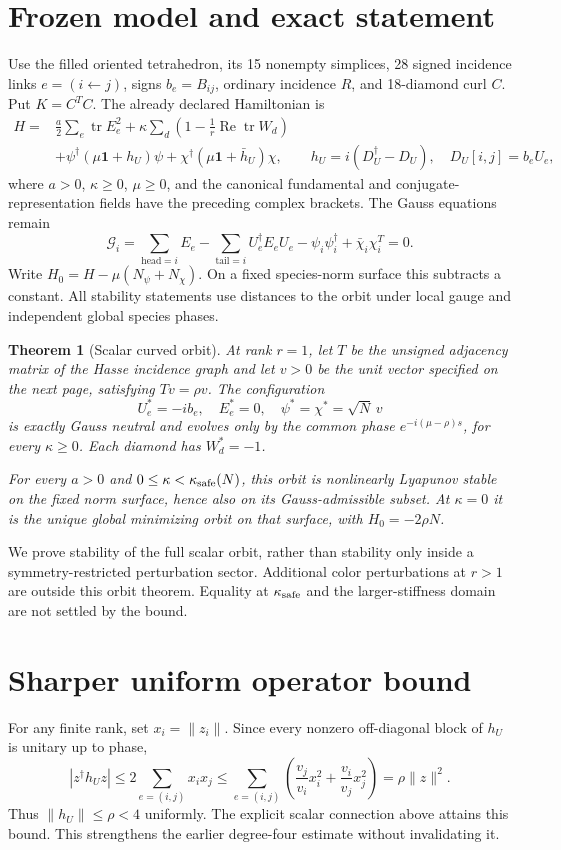 \documentclass[11pt,a4paper]{article}
\newtheorem{theorem}{Theorem}\newtheorem{lemma}[theorem]{Lemma}\newtheorem{proposition}[theorem]{Proposition}
\newcommand{\id}{\mathbf1}\newcommand{\tr}{\operatorname{tr}}\newcommand{\diag}{\operatorname{diag}}\newcommand{\Rea}{\operatorname{Re}}
\begin{document}
\newpage
\section{Frozen model and exact statement}
Use the filled oriented tetrahedron, its 15 nonempty simplices, 28 signed incidence links $e=(i\leftarrow j)$, signs $b_e=B_{ij}$, ordinary incidence $R$, and 18-diamond curl $C$. Put $K=C^TC$. The already declared Hamiltonian is
\begin{align*}
H={}&\frac a2\sum_e\tr E_e^2+\kappa\sum_d\left(1-\frac1r\Rea\tr W_d\right)\\
&+\psi^\dagger(\mu\id+h_U)\psi+\chi^\dagger(\mu\id+\bar h_U)\chi,
\qquad h_U=i(D_U^\dagger-D_U),\quad D_U[i,j]=b_eU_e,
\end{align*}
where $a>0$, $\kappa\geq0$, $\mu\geq0$, and the canonical fundamental and conjugate-representation fields have the preceding complex brackets. The Gauss equations remain
\[
\mathcal G_i=\sum_{\mathrm{head}=i}E_e-
\sum_{\mathrm{tail}=i}U_e^\dagger E_eU_e
-\psi_i\psi_i^\dagger+\bar\chi_i\chi_i^T=0.
\]
Write $H_0=H-\mu(N_\psi+N_\chi)$. On a fixed species-norm surface this subtracts a constant. All stability statements use distances to the orbit under local gauge and independent global species phases.

\begin{theorem}[Scalar curved orbit]\label{th:scalar}
At rank $r=1$, let $T$ be the unsigned adjacency matrix of the Hasse incidence graph and let $v>0$ be the unit vector specified on the next page, satisfying $Tv=\rho v$. The configuration
\[
U_e^*=-ib_e,\quad E_e^*=0,\quad
\psi^*=\chi^*=\sqrt N\,v
\]
is exactly Gauss neutral and evolves only by the common phase
$e^{-i(\mu-\rho)s}$, for every $\kappa\geq0$. Each diamond has $W_d^*=-1$.

For every $a>0$ and $0\leq\kappa<\kappa_{\rm safe}(N)$, this orbit is nonlinearly Lyapunov stable on the fixed norm surface, hence also on its Gauss-admissible subset. At $\kappa=0$ it is the unique global minimizing orbit on that surface, with $H_0=-2\rho N$.
\end{theorem}
We prove stability of the full scalar orbit, rather than stability only inside a symmetry-restricted perturbation sector. Additional color perturbations at $r>1$ are outside this orbit theorem. Equality at $\kappa_{\rm safe}$ and the larger-stiffness domain are not settled by the bound.

\section{Sharper uniform operator bound}
For any finite rank, set $x_i=\|z_i\|$. Since every nonzero off-diagonal block of $h_U$ is unitary up to phase,
\[
|z^\dagger h_Uz|\leq2\sum_{e=(i,j)}x_ix_j
\leq\sum_{e=(i,j)}\left(\frac{v_j}{v_i}x_i^2+\frac{v_i}{v_j}x_j^2\right)
=\rho\|z\|^2.
\]
Thus $\|h_U\|\leq\rho<4$ uniformly. The explicit scalar connection above attains this bound. This strengthens the earlier degree-four estimate without invalidating it.
\end{document}
